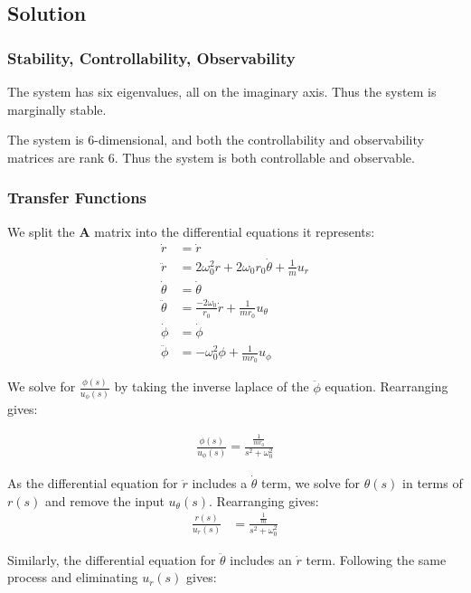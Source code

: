 \documentclass[]{article}
\begin{document}
\subsection{Solution}

\subsubsection{Stability, Controllability, Observability}

The system has six eigenvalues, all on the imaginary axis.
Thus the system is marginally stable.

The system is 6-dimensional, and both the controllability and observability matrices are rank 6.
Thus the system is both controllable and observable.

\subsubsection{Transfer Functions}

We split the $\mathbf{A}$ matrix into the differential equations it represents:
\begin{align*}
	\dot{r} &= \dot{r} \\
	\ddot{r} &= 2\omega_0^2r + 2\omega_0r_0 \dot{\theta} + \frac{1}{m}u_r \\
	\dot{\theta} &= \dot{\theta} \\
	\ddot{\theta} &= \frac{-2\omega_0}{r_0} \dot{r} + \frac{1}{mr_0} u_{\theta} \\
	\dot{\phi} &= \dot{\phi} \\
	\ddot{\phi} &= -\omega_0^2\phi + \frac{1}{mr_0}u_{\phi}
\end{align*}

We solve for $\frac{\phi(s)}{u_{\phi}(s)}$ by taking the inverse laplace of the $\ddot{\phi}$ equation.
Rearranging gives:

\begin{align*}
	\frac{\phi(s)}{u_{\phi}(s)} = \frac{\frac{1}{mr_0}}{s^2 + \omega_0^2} 
\end{align*}

As the differential equation for $\ddot{r}$ includes a $\dot{\theta}$ term, we solve for $\theta(s)$ in terms of $r(s)$ and remove the input $u_{\theta}(s)$.
Rearranging gives:
\begin{align*}
	\frac{r(s)}{u_r(s)} &= \frac{\frac{1}{m}}{s^2 + \omega_0^2}
\end{align*}

Similarly, the differential equation for $\ddot{\theta}$ includes an $\dot{r}$ term.
Following the same process and eliminating $u_r(s)$ gives:
\end{document}
